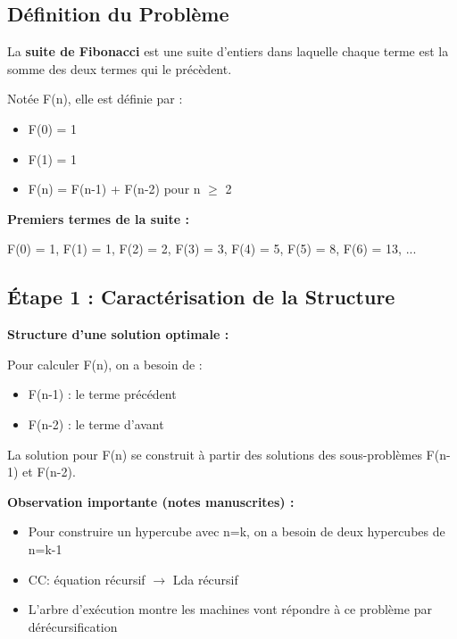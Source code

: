 \documentclass[12pt,a4paper]{article}
\begin{document}
\subsection{Définition du Problème}

\begin{definition}
La \textbf{suite de Fibonacci} est une suite d'entiers dans laquelle chaque terme est la somme des deux termes qui le précèdent.

Notée F(n), elle est définie par :
\begin{itemize}
    \item F(0) = 1
    \item F(1) = 1
    \item F(n) = F(n-1) + F(n-2) pour n $\geq$ 2
\end{itemize}
\end{definition}

\begin{exemple}
\textbf{Premiers termes de la suite :}

F(0) = 1, F(1) = 1, F(2) = 2, F(3) = 3, F(4) = 5, F(5) = 8, F(6) = 13, ...
\end{exemple}

\subsection{Étape 1 : Caractérisation de la Structure}

\begin{important}
\textbf{Structure d'une solution optimale :}

Pour calculer F(n), on a besoin de :
\begin{itemize}
    \item F(n-1) : le terme précédent
    \item F(n-2) : le terme d'avant
\end{itemize}

La solution pour F(n) se construit à partir des solutions des sous-problèmes F(n-1) et F(n-2).
\end{important}

\begin{notecours}
\textbf{Observation importante (notes manuscrites) :}
\begin{itemize}
    \item Pour construire un hypercube avec n=k, on a besoin de deux hypercubes de n=k-1
    \item CC: équation récursif $\rightarrow$ Lda récursif
    \item L'arbre d'exécution montre les machines vont répondre à ce problème par dérécursification
\end{itemize}
\end{notecours}
\end{document}
